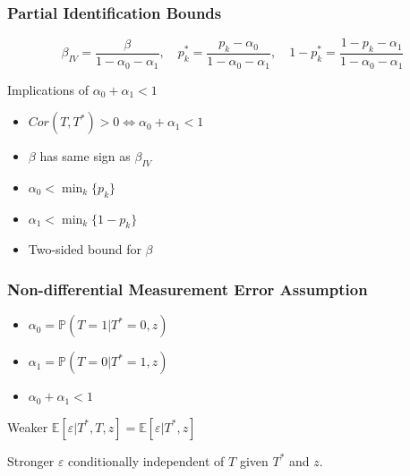 \documentclass{beamer}
\begin{document}
\begin{frame}
  \frametitle{Partial Identification Bounds}
  \small
  \[\beta_{IV} =  \frac{\beta}{1 - \alpha_0 - \alpha_1},
    \quad p_k^* = \frac{p_k - \alpha_0}{1 - \alpha_0 - \alpha_1}, \quad
  1 - p_k^* = \frac{1 - p_k - \alpha_1}{1 - \alpha_0 - \alpha_1} \]

  \vspace{1em}

\normalsize
\begin{block}{Implications of $\alpha_0 + \alpha_1 < 1$}
  \begin{itemize}
    \item $Cor(T, T^*) > 0 \iff \alpha_0 + \alpha_1 < 1$
    \item $\beta$ has same sign as $\beta_{IV}$
    \item $\alpha_0 < \min_k \{p_k\}$
    \item $\alpha_1 < \min_k \{1 - p_k\}$
    \item Two-sided bound for $\beta$
  \end{itemize}
\end{block}
  
\end{frame}
\begin{frame}
  \frametitle{Non-differential Measurement Error Assumption}

  \begin{itemize}
    \item $\alpha_0 = \mathbb{P}(T=1|T^*=0, z)$
    \item $\alpha_1 = \mathbb{P}(T=0|T^*=1, z)$
    \item $\alpha_0 + \alpha_1 < 1$
  \end{itemize}

  \begin{block}{Weaker}
      $\mathbb{E}[\varepsilon|T^*,T,z] = \mathbb{E}[\varepsilon|T^*,z]$
  \end{block}


  \begin{alertblock}{Stronger}
      $\varepsilon$ conditionally independent of $T$ given $T^*$ and $z$.
  \end{alertblock}

  
\end{frame}
\end{document}
